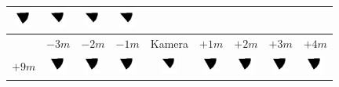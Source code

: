 \begin{tabular}{|c|c|c|c|c|c|c|c|c|}
	\includegraphics[width=0.5cm]{img_Bereich/V2_img_res_Winkel_Y_1000_3000.png}&
	\includegraphics[width=0.5cm]{img_Bereich/V2_img_res_Winkel_Y_2000_3000.png}&
	\includegraphics[width=0.5cm]{img_Bereich/V2_img_res_Winkel_Y_3000_3000.png}&
	\includegraphics[width=0.5cm]{img_Bereich/V2_img_res_Winkel_Y_4000_3000.png}\\ 
	\hline 
	& $-3m$ & $-2m$ & $-1m$ &Kamera& $+1m$ & $+2m$ & $+3m$ & $+4m$ \\ 
	\hline
	\hline 
	$+9m$ &
	\includegraphics[width=0.5cm]{img_Bereich/V2_vid_res_Winkel_Y_-3000_9000.png}&
	\includegraphics[width=0.5cm]{img_Bereich/V2_vid_res_Winkel_Y_-2000_9000.png}&
	\includegraphics[width=0.5cm]{img_Bereich/V2_vid_res_Winkel_Y_-1000_9000.png}&
	\includegraphics[width=0.5cm]{img_Bereich/V2_vid_res_Winkel_Y_0_9000.png}&
	\includegraphics[width=0.5cm]{img_Bereich/V2_vid_res_Winkel_Y_1000_9000.png}&
	\includegraphics[width=0.5cm]{img_Bereich/V2_vid_res_Winkel_Y_2000_9000.png}&
	\includegraphics[width=0.5cm]{img_Bereich/V2_vid_res_Winkel_Y_3000_9000.png}&
	\includegraphics[width=0.5cm]{img_Bereich/V2_vid_res_Winkel_Y_4000_9000.png}\\ 

\end{tabular}
